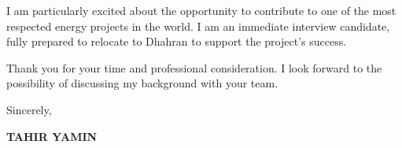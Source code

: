 \documentclass[11pt,a4paper]{article}
\begin{document}
I am particularly excited about the opportunity to contribute to one of the most respected energy projects in the world. I am an immediate interview candidate, fully prepared to relocate to Dhahran to support the project’s success.

Thank you for your time and professional consideration. I look forward to the possibility of discussing my background with your team.

\vspace{0.5cm}
Sincerely,

\vspace{0.5cm}
\textbf{TAHIR YAMIN}
\end{document}

